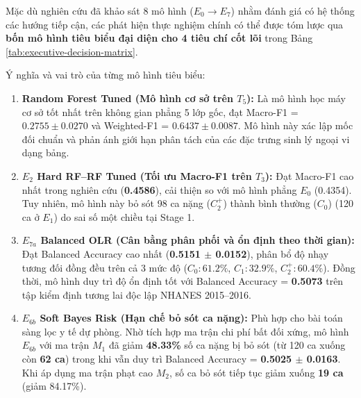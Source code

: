 Mặc dù nghiên cứu đã khảo sát 8 mô hình ($E_0 \to E_7$) nhằm đánh giá có hệ thống các hướng tiếp cận, các phát hiện thực nghiệm chính có thể được tóm lược qua \textbf{bốn mô hình tiêu biểu đại diện cho 4 tiêu chí cốt lõi} trong Bảng \ref{tab:executive-decision-matrix}.



Ý nghĩa và vai trò của từng mô hình tiêu biểu:
\begin{enumerate}
    \item \textbf{Random Forest Tuned (Mô hình cơ sở trên $T_5$):} Là mô hình học máy cơ sở tốt nhất trên không gian phẳng 5 lớp gốc, đạt Macro-F1 = $0.2755 \pm 0.0270$ và Weighted-F1 = $0.6437 \pm 0.0087$. Mô hình này xác lập mốc đối chuẩn và phản ánh giới hạn phân tách của các đặc trưng sinh lý ngoại vi dạng bảng.
    \item \textbf{$E_2$ Hard RF--RF Tuned (Tối ưu Macro-F1 trên $T_3$):} Đạt Macro-F1 cao nhất trong nghiên cứu (\textbf{0.4586}), cải thiện so với mô hình phẳng $E_0$ (0.4354). Tuy nhiên, mô hình này bỏ sót 98 ca nặng ($C_2^+$) thành bình thường ($C_0$) (120 ca ở $E_1$) do sai số một chiều tại Stage 1.
    \item \textbf{$E_{7a}$ Balanced OLR (Cân bằng phân phối và ổn định theo thời gian):} Đạt Balanced Accuracy cao nhất (\textbf{0.5151 $\pm$ 0.0152}), phân bổ độ nhạy tương đối đồng đều trên cả 3 mức độ ($C_0: 61.2\%$, $C_1: 32.9\%$, $C_2^+: 60.4\%$). Đồng thời, mô hình duy trì độ ổn định tốt với Balanced Accuracy = \textbf{0.5073} trên tập kiểm định tương lai độc lập NHANES 2015--2016.
    \item \textbf{$E_{6b}$ Soft Bayes Risk (Hạn chế bỏ sót ca nặng):} Phù hợp cho bài toán sàng lọc y tế dự phòng. Nhờ tích hợp ma trận chi phí bất đối xứng, mô hình $E_{6b}$ với ma trận $M_1$ đã giảm \textbf{48.33\%} số ca nặng bị bỏ sót (từ 120 ca xuống còn \textbf{62 ca}) trong khi vẫn duy trì Balanced Accuracy = \textbf{0.5025 $\pm$ 0.0163}. Khi áp dụng ma trận phạt cao $M_2$, số ca bỏ sót tiếp tục giảm xuống \textbf{19 ca} (giảm 84.17\%).
\end{enumerate}

